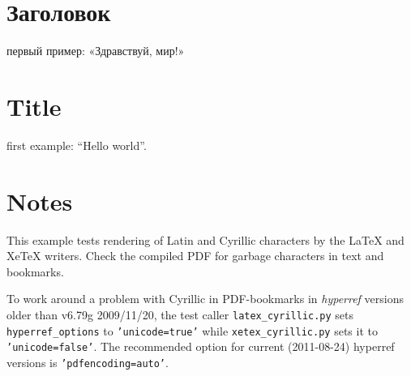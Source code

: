 \documentclass[a4paper,russian]{article}
\providecommand*{\DUroletitlereference}[1]{\textsl{#1}}
\begin{document}
\section{Заголовок%
  \label{id1}%
}

первый пример: «Здравствуй, мир!»


\section{Title%
  \label{title}%
}

\foreignlanguage{english}{first example: “Hello world”.}


\section{Notes%
  \label{notes}%
}

\foreignlanguage{english}{This example tests rendering of Latin and Cyrillic characters by the LaTeX
and XeTeX writers. Check the compiled PDF for garbage characters in text and
bookmarks.}

\foreignlanguage{english}{To work around a problem with Cyrillic in PDF-bookmarks in \DUroletitlereference{hyperref}
versions older than v6.79g 2009/11/20, the test caller \texttt{latex\_cyrillic.py}
sets \texttt{hyperref\_options} to \texttt{'unicode=true'} while \texttt{xetex\_cyrillic.py}
sets it to \texttt{'unicode=false'}. The recommended option for current
(2011-08-24) hyperref versions is \texttt{'pdfencoding=auto'}.}
\end{document}
